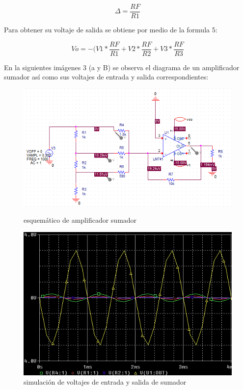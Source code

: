 \documentclass[11pt,a4paper]{article}
\begin{document}
\begin{equation}
\Delta=\frac{RF}{R1}
\end{equation}

Para obtener su voltaje de salida se obtiene por medio de la formula 5:

\begin{equation}
Vo=-(V1*\frac{RF}{R1}+V2*\frac{RF}{R2}+V3*\frac{RF}{R3}
\end{equation}

En la siguientes imágenes 3 (a y B) se observa el diagrama de un amplificador sumador así como sus voltajes de entrada y salida correspondientes:

\begin{figure}[ht]
\begin{center}
\includegraphics[scale=0.5]{5.PNG}
\caption{esquemático de amplificador sumador}
\includegraphics[scale=0.5]{6.PNG}
\caption{simulación de voltajes de entrada y salida de sumador}
\end{center}
\end{figure}
\end{document}
